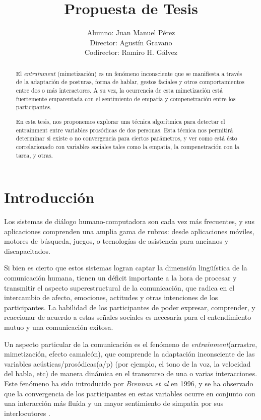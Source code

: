 \documentclass[a4paper,11pt]{article}
\title{Propuesta de Tesis}
\author{Alumno: Juan Manuel Pérez \\
Director: Agustín Gravano \\
Codirector: Ramiro H. Gálvez}
\begin{document}
\maketitle

\begin{abstract}

El \emph{entrainment} (mimetización) es un fenómeno inconsciente que se manifiesta a través de la adaptación de posturas, forma de hablar, gestos faciales y otros comportamientos entre dos o más interactores. A su vez, la ocurrencia de esta mimetización está fuertemente emparentada con el sentimiento de empatía y compenetración entre los participantes.

En esta tesis, nos proponemos explorar una técnica algorítmica para detectar el entrainment entre variables prosódicas de dos personas. Esta técnica nos permitirá determinar si existe o no convergencia para ciertos parámetros, y ver como está ésto correlacionado con variables sociales tales como la empatía, la compenetración con la tarea, y otras.


\end{abstract}


\section*{Introducción}

Los sistemas de diálogo humano-computadora son cada vez más frecuentes, y sus aplicaciones comprenden una amplia gama de rubros: desde aplicaciones móviles, motores de búsqueda, juegos, o tecnologías de asistencia para ancianos y discapacitados.

Si bien es cierto que estos sistemas logran captar la dimensión lingüística de la comunicación humana, tienen un déficit importante a la hora de procesar y transmitir el aspecto superestructural de la comunicación, que radica en el intercambio de afecto, emociones, actitudes y otras intenciones de los participantes. La habilidad de los participantes de poder expresar, comprender, y reaccionar de acuerdo a estas señales sociales es necesaria para el entendimiento mutuo y una comunicación exitosa.

Un aspecto particular de la comunicación es el fenómeno de \emph{entrainment}(arrastre, mimetización, efecto camaleón), que comprende la adaptación inconsciente de las variables acústicas/prosódicas(a/p) (por ejemplo, el tono de la voz, la velocidad del habla, etc) de manera dinámica en el transcurso de una o varias interacciones. Este fenómeno ha sido introducido por \emph{Brennan et al}\cite{BRE1996} en 1996, y se ha observado que la convergencia de los participantes en estas variables ocurre en conjunto con una interacción más fluída y un mayor sentimiento de simpatía por sus interlocutores \cite{CHAR1999}.
\end{document}
